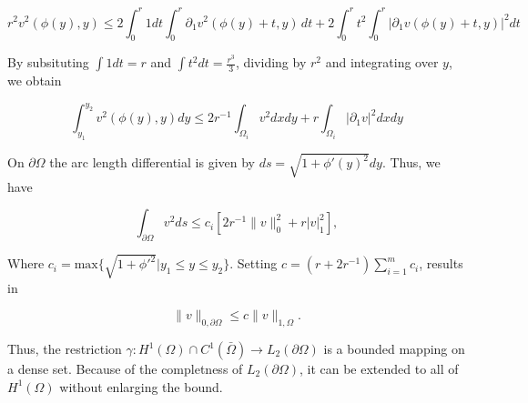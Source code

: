 \begin{bev}
    \begin{equation}
        r^2 v^2(\phi(y), y) \leq 2 \int_0^r 1 dt \int_0^r \partial_1 v^2(\phi(y) + t, y) \, dt +  2\int_0^r t^2 \int_0^r | \partial_1  v(\phi(y) + t, y) |^2 dt
    \end{equation}

    By subsituting $\int 1 dt = r$ and $\int t^2 dt = \frac{r^3}{3}$, dividing by $r^2$ and integrating over $y$, we obtain

    \begin{equation}
        \int_{y_1}^{y_2} v^2(\phi(y), y) dy \leq  2r^{-1} \int_{\Omega_i} v^2 dx dy + r \int_{\Omega_i} | \partial_1 v |^2 dx dy
    \end{equation}

    On $\partial\Omega$ the arc length differential is given by $ds = \sqrt{1 + \phi'{(y)}^2} dy$. Thus, we have

    \begin{equation}
        \int_{\partial\Omega} v^2 ds \leq c_i \left[ 2r^{-1} \| v \|_0^2 + r | v |^2_1 \right],
    \end{equation}

    Where $c_i = \text{max}\{\sqrt{1+{\phi'}^2} | y_1 \leq y \leq y_2 \}$. Setting $c=(r+2r^{-1})\sum_{i=1}^m c_i$, results in

    \begin{equation}
        \| v \|_{0,\partial\Omega} \leq c \| v \|_{1,\Omega}.
    \end{equation}

    Thus, the restriction $\gamma : H^1(\Omega) \cap C^1(\bar{\Omega}) \to L_2(\partial \Omega)$ is a bounded mapping on a dense set. Because of the completness of $L_2(\partial \Omega)$, it can be extended to all of $H^1(\Omega)$ without enlarging the bound.
\end{bev}